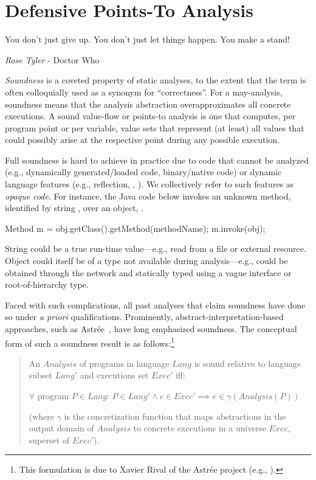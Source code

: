 \chapter{Defensive Points-To Analysis}
\label{chapter:defensive}
\epigraph{You don’t just give up. You don’t just let things happen. You make a stand!}{\textit{Rose Tyler} - Doctor Who}

\emph{Soundness} is a coveted property of static analyses, to the extent that the term is often colloquially used as a synonym for ``correctness''. For a may-analysis, soundness means that the analysis abstraction overapproximates all concrete executions. A sound value-flow or points-to analysis is one that computes, per program point or per variable, value sets that represent (at least) all values that could possibly arise at the respective point during any possible execution.

Full soundness is hard to achieve in practice due to code that cannot be analyzed (e.g., dynamically generated/loaded code, binary/native code) or dynamic language features (e.g., reflection, , ). We collectively refer to such features as \emph{opaque code}. For instance, the Java code below invokes an unknown method, identified by string , over an object, .

\begin{javaBox}
Method m = obj.getClass().getMethod(methodName);
m.invoke(obj);  
\end{javaBox}

String  could be a true run-time value---e.g., read from a file or external resource. Object  could itself be of a type not available during analysis---e.g.,  could be obtained through the network and statically typed using a vague interface or root-of-hierarchy type.

Faced with such complications, all past analyses that claim soundness have done so under \emph{a priori} qualifications. Prominently, abstract-interpretation-based~\cite{popl:1977:Cousot} approaches, such as Astr\'{e}e~\cite{sas:2007:Delmas}, have long emphasized soundness. The conceptual form of such a soundness result is as follows:\footnote{This formulation is due to Xavier Rival of the Astr\'{e}e project (e.g., \cite{misc:Xavier}).}

\begin{quote}
An $Analysis$ of programs in language $Lang$ is sound relative to language subset $Lang'$ and executions set $Exec'$ iff:

\hspace{8 mm} $\forall$ program $P \in Lang$: $P \in Lang' \land e \in Exec' \implies e \in \gamma(Analysis(P))$

(where $\gamma$ is the concretization function that maps abstractions in the output domain of $Analysis$ to concrete executions in a universe $Exec$, superset of $Exec'$).
\end{quote}

